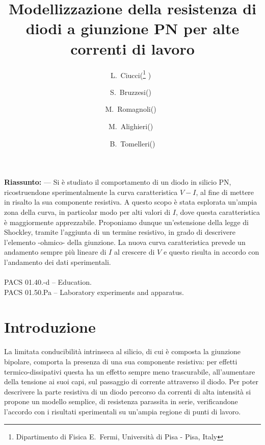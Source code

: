 \documentclass{article}[a4paper, oneside, 11pt]
\title{Modellizzazione della resistenza di diodi a giunzione PN per alte 
correnti di lavoro}
\author{L.~Ciucci(\thanks{Dipartimento di Fisica E.~Fermi, Universit\`a di Pisa 
- Pisa, Italy} )~\and S.~Bruzzesi(\protect\footnotemark[1] )~\and 
M.~Romagnoli(\protect\footnotemark[1] )~\and 
M.~Alighieri(\protect\footnotemark[1] )~\and 
B.~Tomelleri(\protect\footnotemark[1] )}
\begin{document}
\maketitle

\begin{mdframed}
\textbf{Riassunto:} --- Si \`e studiato il comportamento di un diodo in silicio
PN, ricostruendone sperimentalmente la curva caratteristica $V-I$, al fine di
mettere in risalto la sua componente resistiva. A questo scopo \`e stata
esplorata un'ampia zona della curva, in particolar modo per alti valori di
$I$, dove questa caratteristica \`e maggiormente apprezzabile. Proponiamo dunque
un'estensione della legge di Shockley, tramite l'aggiunta di un termine
resistivo, in grado di descrivere l'elemento -ohmico- della giunzione.
La nuova curva caratteristica prevede un andamento sempre pi\`u lineare di $I$
al crescere di $V$ e questo risulta in accordo con l'andamento dei dati
sperimentali.
\\\\
PACS 01.40.-d – Education.\\
PACS 01.50.Pa – Laboratory experiments and apparatus.
\end{mdframed}


\section{Introduzione}
La limitata conducibilit\`a intrinseca al silicio, di cui \`e composta la
giunzione bipolare, comporta la presenza di una sua componente resistiva:
per effetti termico-dissipativi questa ha un effetto sempre meno
trascurabile, all'aumentare della tensione ai suoi capi, sul passaggio di
corrente attraverso il diodo.
Per poter descrivere la parte resistiva di un diodo percorso da correnti
di alta intensit\`a %
si propone un modello semplice, di resistenza parassita in serie, verificandone
l'accordo con i risultati sperimentali su un'ampia regione di punti di lavoro.
\end{document}
